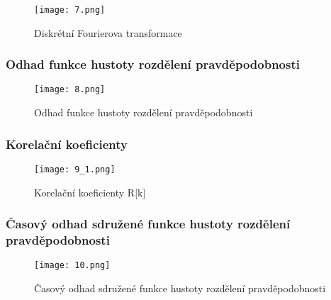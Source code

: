 \documentclass[a4paper,10pt]{article}
\begin{document}
\begin{multicols}{2}
\begin{figure}[H]
	\centering
	\texttt{[image: 7.png]}
	\caption{Diskrétní Fourierova transformace}
	\label{fig:obr7}
\end{figure}

\subsubsection*{Odhad funkce hustoty rozdělení pravděpodobnosti}

\begin{figure}[H]
	\centering
	\texttt{[image: 8.png]}
	\caption{Odhad funkce hustoty rozdělení pravděpodobnosti}
	\label{fig:obr8}
\end{figure}

\subsubsection*{Korelační koeficienty}

\begin{figure}[H]
	\centering
	\texttt{[image: 9\_1.png]}
	\caption{Korelační koeficienty R[k]}
	\label{fig:obr9}
\end{figure}

\subsubsection*{Časový odhad sdružené funkce hustoty rozdělení pravděpodobnosti}

\begin{figure}[H]
	\centering
	\texttt{[image: 10.png]}
	\caption{Časový odhad sdružené funkce hustoty rozdělení pravděpodobnosti}
	\label{fig:obr10}
\end{figure}

\end{multicols}
\end{document}
